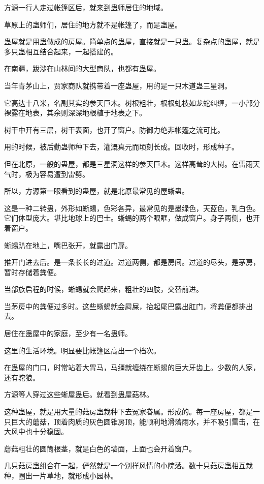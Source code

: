 \begin{this_body}
方源一行人走过帐篷区后，就来到蛊师居住的地域。

草原上的蛊师们，居住的地方就不是帐篷了，而是蛊屋。

蛊屋就是用蛊做成的房屋。简单点的蛊屋，直接就是一只蛊。复杂点的蛊屋，就是多只蛊相互结合起来，一起搭建的。

在南疆，跋涉在山林间的大型商队，也都有蛊屋。

当年青茅山上，贾家商队就携带着一座蛊屋，用的是一只木道蛊三星洞。

它高达十八米，名副其实的参天巨木。树根粗壮，根根虬枝如龙蛇纠缠，一小部分裸露在地表，其余则深深地根植于地表之下。

树干中开有三层，树干表面，也开了窗户。防御力绝非帐篷之流可比。

用的时候，被后勤蛊师种下去，灌溉真元而顷刻长成。回收时，形成种子。

但在北原，一般的蛊屋，都是三星洞这样的参天巨木。这样高耸的大树。在雷雨天气时，极为容易遭到雷劈。

所以，方源第一眼看到的蛊屋，就是北原最常见的屋蜥蛊。

这是一种二转蛊，外形如蜥蜴，色彩各异，最常见的是墨绿色，天蓝色，乳白色。它们体型庞大。堪比地球上的巴士。蜥蜴的两个眼眶，做成窗户。身子两侧，也开着窗户。

蜥蜴趴在地上，嘴巴张开，就露出门扉。

推开门进去后。是一条长长的过道。过道两侧，都是房间。过道的尽头，是茅房，暂时存储着粪便。

当部族启程的时候，蜥蜴就会爬起来，粗壮的四肢，交替前进。

当茅房中的粪便过多时。这些蜥蜴就会屙屎，抬起尾巴露出肛门，将粪便都排出去。

居住在蛊屋中的家庭，至少有一名蛊师。

这里的生活环境。明显要比帐篷区高出一个档次。

在蛊屋的门口，时常站着大胃马，马缰就缠绕在蜥蜴的巨大牙齿上。少数的人家，还有驼狼。

方源等人穿过这些蜥屋蛊后。就看到蛊屋菇林。

这种蛊屋，就是用大量的菇房蛊栽种下去冤家眷属。形成的。每一座房屋，都是一只巨大的蘑菇，顶着肉质的灰色圆锥房顶，能顺利地滑落雨水，并不吸引雷击，在大风中也十分稳固。

蘑菇粗壮的圆筒根茎，就是白色的墙面，上面也会开着窗户。

几只菇房蛊组合在一起，俨然就是一个别样风情的小院落。数十只菇房蛊相互栽种，圈出一片草地，就形成小园林。


\end{this_body}
